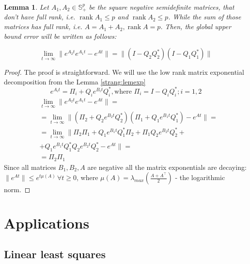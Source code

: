 \documentclass{article}
\newtheorem{lemma}{Lemma}
\begin{document}
\begin{lemma}
    \label{strang:lemupper_2}
    Let $A_1, A_2 \in \mathbb{S}^p_{+}$ be the square negative semidefinite matrices, that don't have full rank, i.e. $\operatorname{rank}{A_1} \leq p$ and $\operatorname{rank}{A_2} \leq p$. While the sum of those matrices has full rank, i.e. $A = A_1 + A_2, \operatorname{rank}{A} = p$. Then, the global upper bound error will be written as follows:

    \begin{equation}\label{strang:lemupper}
        \lim_{t \to \infty}\| e^{A_2t}e^{A_1t} - e^{At}\| = \|(I - Q_2Q_2^*)(I - Q_1Q_1^*)\|
    \end{equation}
\end{lemma}
\begin{proof}
    The proof is straightforward. We will use the low rank matrix exponential decomposition from the Lemma \ref{strang:lemexp}
    $$
    e^{A_it} = \Pi_i + Q_i e^{B_it} Q_i^*, \text{where } \Pi_i = I - Q_iQ_i^*; i = 1,2
    $$
    \begin{align*}
    &\lim_{t \to \infty}\| e^{A_2t}e^{A_1t} - e^{At}\| = \\ 
    &= \lim_{t \to \infty}\| (\Pi_2 + Q_2 e^{B_2t} Q_2^*)(\Pi_1 + Q_1 e^{B_1t} Q_1^*) - e^{At}\| = \\
    &= \lim_{t \to \infty}\| \Pi_2\Pi_1 + Q_1 e^{B_1t} Q_1^*\Pi_2 + \Pi_1Q_2 e^{B_2t} Q_2^* + \\
    &+  Q_1 e^{B_1t} Q_1^* Q_2 e^{B_2t} Q_2^* - e^{At}\| =\\&= \Pi_2 \Pi_1
    \end{align*}
    Since all matrices $B_1, B_2, A$ are negative all the matrix exponentials are decaying: $\|e^{At}\|\leq e^{t\mu (A)}\, \forall t\geq 0$, where $\mu(A) = \lambda_{max} \left( \frac{A + A^\top}{2}\right)$ - the logarithmic norm.
\end{proof}


\section{Applications}
\subsection{Linear least squares}
\end{document}
